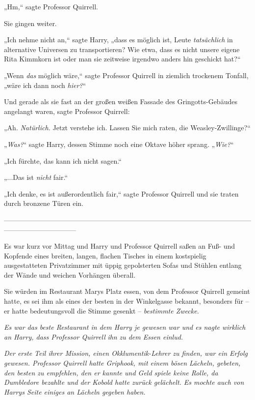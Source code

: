 {„Hm,“ sagte Professor Quirrell.

Sie gingen weiter.

„Ich nehme nicht an,“ sagte Harry, „dass es möglich ist, Leute \emph{tatsächlich} in alternative Universen zu transportieren? Wie etwa, dass es nicht unsere eigene Rita Kimmkorn ist oder man sie zeitweise irgendwo anders hin geschickt hat?“

„Wenn \emph{das} möglich wäre,“ sagte Professor Quirrell in ziemlich trockenem Tonfall, „wäre ich dann noch \emph{hier?}“

Und gerade als sie fast an der großen weißen Fassade des Gringotts-Gebäudes angelangt waren, sagte Professor Quirrell:

„Ah. \emph{Natürlich.} Jetzt verstehe ich. Lassen Sie mich raten, die Weasley-Zwillinge?“

„\emph{Was?}“ sagte Harry, dessen Stimme noch eine Oktave höher sprang. „\emph{Wie?}“

„Ich fürchte, das kann ich nicht sagen.“

„...Das ist \emph{nicht} fair.“

„Ich denke, es ist außerordentlich fair,“ sagte Professor Quirrell und sie traten durch bronzene Türen ein.

--------------------------------------------------------------------------------------------------------------------------------------------

\hfill\break Es war kurz vor Mittag und Harry und Professor Quirrell saßen an Fuß- und Kopfende eines breiten, langen, flachen Tisches in einem kostspielig ausgestatteten Privatzimmer mit üppig gepolsterten Sofas und Stühlen entlang der Wände und weichen Vorhängen überall.

Sie würden im Restaurant Marys Platz essen, von dem Professor Quirrell gemeint hatte, es sei ihm als eines der besten in der Winkelgasse bekannt, besonders für -- er hatte bedeutungsvoll die Stimme gesenkt -- \emph{bestimmte Zwecke.}

\emph{Es war das beste Restaurant in dem Harry je gewesen war und es nagte wirklich an Harry, dass Professor Quirrell} \emph{\emph{ihn}} \emph{zu dem Essen einlud.}

\emph{Der erste Teil ihrer Mission, einen Okklumentik-Lehrer zu finden, war ein Erfolg gewesen. Professor Quirrell hatte Griphook, mit einem bösen Lächeln, gebeten, den besten zu empfehlen, den er kannte und Geld spiele keine Rolle, da Dumbledore bezahlte und der Kobold hatte zurück gelächelt. Es mochte auch von Harrys Seite einiges an Lächeln gegeben haben.}

}
